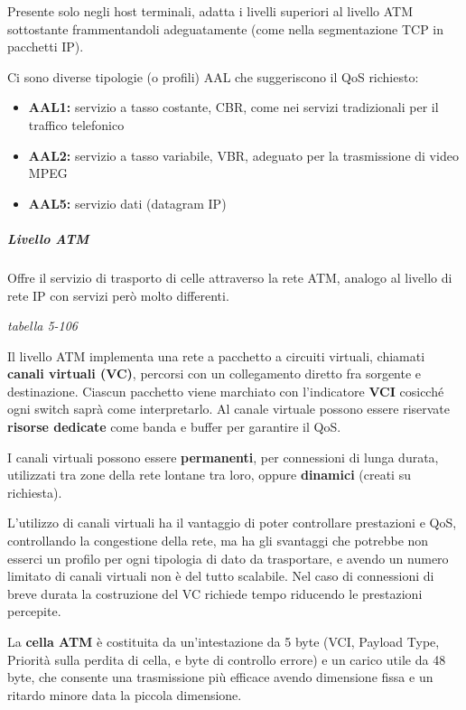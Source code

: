 \documentclass[
]{article}
\begin{document}
Presente solo negli host terminali, adatta i livelli superiori al
livello ATM sottostante frammentandoli adeguatamente (come nella
segmentazione TCP in pacchetti IP).

Ci sono diverse tipologie (o profili) AAL che suggeriscono il QoS
richiesto:

\begin{itemize}
\item
  \textbf{AAL1:} servizio a tasso costante, CBR, come nei servizi
  tradizionali per il traffico telefonico
\item
  \textbf{AAL2:} servizio a tasso variabile, VBR, adeguato per la
  trasmissione di video MPEG
\item
  \textbf{AAL5:} servizio dati (datagram IP)
\end{itemize}

\hypertarget{header-n388}{%
\subparagraph{Livello ATM}\label{header-n388}}

Offre il servizio di trasporto di celle attraverso la rete ATM, analogo
al livello di rete IP con servizi però molto differenti.

\emph{tabella 5-106}

Il livello ATM implementa una rete a pacchetto a circuiti virtuali,
chiamati \textbf{canali virtuali (VC)}, percorsi con un collegamento
diretto fra sorgente e destinazione. Ciascun pacchetto viene marchiato
con l'indicatore \textbf{VCI} cosicché ogni switch saprà come
interpretarlo. Al canale virtuale possono essere riservate
\textbf{risorse dedicate} come banda e buffer per garantire il QoS.

I canali virtuali possono essere \textbf{permanenti}, per connessioni di
lunga durata, utilizzati tra zone della rete lontane tra loro, oppure
\textbf{dinamici} (creati su richiesta).

L'utilizzo di canali virtuali ha il vantaggio di poter controllare
prestazioni e QoS, controllando la congestione della rete, ma ha gli
svantaggi che potrebbe non esserci un profilo per ogni tipologia di dato
da trasportare, e avendo un numero limitato di canali virtuali non è del
tutto scalabile. Nel caso di connessioni di breve durata la costruzione
del VC richiede tempo riducendo le prestazioni percepite.

La \textbf{cella ATM} è costituita da un'intestazione da 5 byte (VCI,
Payload Type, Priorità sulla perdita di cella, e byte di controllo
errore) e un carico utile da 48 byte, che consente una trasmissione più
efficace avendo dimensione fissa e un ritardo minore data la piccola
dimensione.
\end{document}
